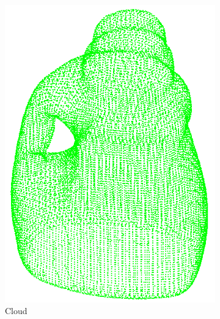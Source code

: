 \begin{figure}[!t]
\begin{subfigure}{0.3\linewidth}
    \includegraphics[width=\linewidth]{Figures/ObjRecog/detergent_cloud.png}
    \caption{Cloud}
    \label{fig:objrecog:meshcloudgrid:cloud}
  \end{subfigure}
  \begin{subfigure}{0.3\linewidth}
    \centering

\end{subfigure}
\end{figure}
